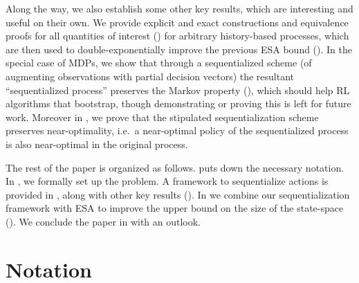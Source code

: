 \documentclass{article} %
\begin{document}
Along the way, we also establish some other key results, which are interesting and useful on their own. We provide explicit and exact constructions and equivalence proofs for all quantities of interest () for arbitrary history-based processes, which are then used to double-exponentially improve the previous ESA bound ().
In the special case of MDPs, we show that through a sequentialized scheme (of augmenting observations with partial decision vectors) the resultant ``sequentialized process'' preserves the Markov property (), which should help RL algorithms that bootstrap, though demonstrating or proving this is left for future work. Moreover in , we prove that the stipulated sequentialization scheme preserves near-optimality, i.e.\ a near-optimal policy of the sequentialized process is also near-optimal in the original process.

The rest of the paper is organized as follows.  puts down the necessary notation. In , we formally set up the problem. A framework to sequentialize actions is provided in , along with other key results (). In  we combine our sequentialization framework with ESA to improve the upper bound on the size of the state-space (). We conclude the paper in  with an outlook.


\section{Notation}\label{sec:notation}
\end{document}
